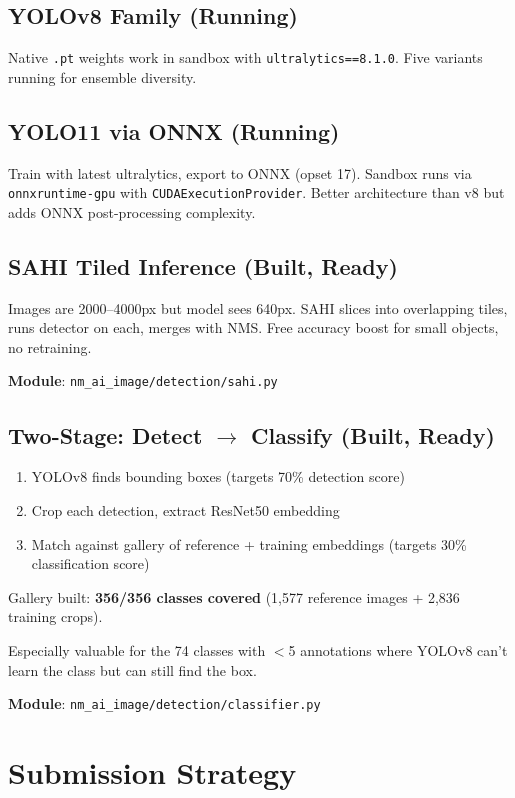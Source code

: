 \documentclass[11pt,a4paper]{article}
\begin{document}
\subsection{YOLOv8 Family (Running)}
Native \texttt{.pt} weights work in sandbox with \texttt{ultralytics==8.1.0}. Five variants running for ensemble diversity.

\subsection{YOLO11 via ONNX (Running)}
Train with latest ultralytics, export to ONNX (opset 17). Sandbox runs via \texttt{onnxruntime-gpu} with \texttt{CUDAExecutionProvider}. Better architecture than v8 but adds ONNX post-processing complexity.

\subsection{SAHI Tiled Inference (Built, Ready)}
Images are 2000--4000px but model sees 640px. SAHI slices into overlapping tiles, runs detector on each, merges with NMS. Free accuracy boost for small objects, no retraining.

\textbf{Module}: \texttt{nm\_ai\_image/detection/sahi.py}

\subsection{Two-Stage: Detect $\rightarrow$ Classify (Built, Ready)}
\begin{enumerate}[nosep]
  \item YOLOv8 finds bounding boxes (targets 70\% detection score)
  \item Crop each detection, extract ResNet50 embedding
  \item Match against gallery of reference + training embeddings (targets 30\% classification score)
\end{enumerate}

Gallery built: \textbf{356/356 classes covered} (1,577 reference images + 2,836 training crops).

Especially valuable for the 74 classes with $<$5 annotations where YOLOv8 can't learn the class but can still find the box.

\textbf{Module}: \texttt{nm\_ai\_image/detection/classifier.py}

\section{Submission Strategy}
\end{document}
